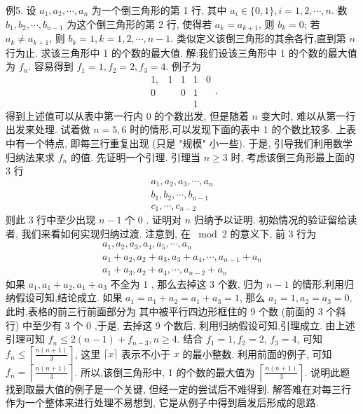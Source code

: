 例5. 设 $a_1, a_2, \cdots, a_n$ 为一个倒三角形的第 1 行, 其中 $a_i \in\{0,1\}, i= 1,2, \cdots, n$. 数 $b_1, b_2, \cdots, b_{n-1}$ 为这个倒三角形的第 2 行, 使得若 $a_k=a_{k+1}$, 则 $b_k=0$; 若 $a_k \neq a_{k+1}$, 则 $b_k=1, k=1,2, \cdots, n-1$. 类似定义该倒三角形的其余各行,直到第 $n$ 行为止.
求该三角形中 1 的个数的最大值.
解:我们设该三角形中 1 的个数的最大值为 $f_n$. 容易得到 $f_1=1, f_2= 2, f_3=4$. 例子为
$$
\begin{array}{cccccc}
1, & 1 & 1 & 1 & 0 \\
0 & & 0 & 1 \\
& & & 1
\end{array} .
$$
得到上述值可以从表中第一行内 0 的个数出发, 但是随着 $n$ 变大时, 难以从第一行出发来处理.
试着做 $n=5,6$ 时的情形,可以发现下面的表中 1 的个数比较多.
上表中有一个特点, 即每三行重复出现 (只是 "规模" 小一些). 于是, 引导我们利用数学归纳法来求 $f_n$ 的值.
先证明一个引理.
引理当 $n \geqslant 3$ 时, 考虑该倒三角形最上面的 3 行
$$
\begin{gathered}
a_1, a_2, a_3, \cdots, a_n \\
b_1, b_2, \cdots, b_{n-1} \\
c_1, \cdots, c_{n-2}
\end{gathered}
$$
则此 3 行中至少出现 $n-1$ 个 0 .
证明对 $n$ 归纳予以证明.
初始情况的验证留给读者, 我们来看如何实现归纳过渡.
注意到, 在 $\bmod 2$ 的意义下, 前 3 行为
$$
\begin{gathered}
a_1, a_2, a_3, a_4, a_5, \cdots, a_n \\
a_1+a_2, a_2+a_3, a_3+a_4, \cdots, a_{n-1}+a_n \\
a_1+a_3, a_2+a_4, \cdots, a_{n-2}+a_n
\end{gathered}
$$
如果 $a_1, a_1+a_2, a_1+a_3$ 不全为 1 , 那么去掉这 3 个数, 归为 $n-1$ 的情形,利用归纳假设可知,结论成立.
如果 $a_1=a_1+a_2=a_1+a_3=1$, 那么 $a_1=1, a_2=a_3=0$, 此时,表格的前三行前面部分为
其中被平行四边形框住的 9 个数 (前面的 3 个斜行) 中至少有 3 个 0 ,于是, 去掉这 9 个数后, 利用归纳假设可知,引理成立.
由上述引理可知 $f_n \leqslant 2(n-1)+f_{n-3}, n \geqslant 4$. 结合 $f_1=1, f_2=2$, $f_3=4$, 可知 $f_n \leqslant\left\lceil\frac{n(n+1)}{3}\right\rceil$, 这里 $\lceil x\rceil$ 表示不小于 $x$ 的最小整数.
利用前面的例子, 可知 $f_n=\left\lceil\frac{n(n+1)}{3}\right\rceil$.
所以,该倒三角形中, 1 的个数的最大值为 $\left\lceil\frac{n(n+1)}{3}\right\rceil$.
说明此题找到取最大值的例子是一个关键, 但经一定的尝试后不难得到.
解答难在对每三行作为一个整体来进行处理不易想到, 它是从例子中得到启发后形成的思路.



